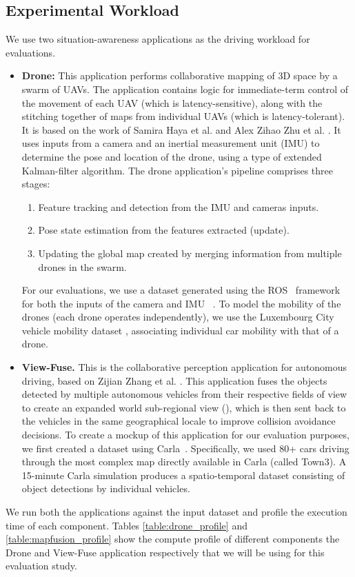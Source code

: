 \subsection{Experimental Workload}
We use two situation-awareness applications as the driving workload for evaluations. 
\begin{itemize}
\item \textbf{Drone: } This application performs collaborative mapping of 3D space by a swarm of UAVs. The application contains logic for immediate-term control of the movement of each UAV (which is latency-sensitive), along with the stitching together of maps from individual UAVs (which is latency-tolerant). It is based on the work of Samira Haya et al. \cite{dronenavi} and Alex Zihao Zhu et al. \cite{dronenavi1}. It uses inputs from a camera and an inertial measurement unit (IMU) to determine the pose and location of the drone, using a type of extended Kalman-filter algorithm. The drone application's pipeline comprises three stages: 
\begin{enumerate}
\item Feature tracking and detection from the IMU and cameras inputs.
\item Pose state estimation from the features extracted (update).
\item Updating the global map created by merging information from multiple drones in the swarm.
\end{enumerate}
For our evaluations, we use a dataset generated using the ROS~\cite{ros} framework for both the inputs of the camera and IMU ~\cite{dronedataset}. To model the mobility of the drones (each drone operates independently), we use the Luxembourg City vehicle mobility dataset \cite{lust}, associating individual car mobility with that of a drone. 

\item \textbf{View-Fuse.} This is the collaborative perception application for autonomous driving, based on Zijian Zhang et al. \cite{mapfusionimpl}. This application fuses the objects detected by multiple autonomous vehicles from their respective fields of view to create an expanded world sub-regional view (), which is then sent back to the vehicles in the same geographical locale to improve collision avoidance decisions. To create a mockup of this application for our evaluation purposes, we first created a dataset using Carla~\cite{carlasim}. Specifically, we used 80+ cars driving through the most complex map directly available in Carla (called Town3). A 15-minute Carla simulation produces a spatio-temporal dataset consisting of object detections by individual vehicles. 
\end{itemize}
We run both the applications against the input dataset and profile the execution time of each component. Tables \cref{table:drone_profile} and \cref{table:mapfusion_profile} show the compute profile of different components the Drone and View-Fuse application respectively that we will be using for this evaluation study.

